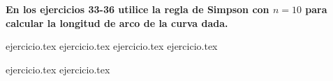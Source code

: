 \vspace{0.5cm}
\noindent\textbf{En los ejercicios 33-36 utilice la regla de Simpson con $n = 10$ para calcular la longitud de arco de la curva dada.}
\begin{enumerate}
    \setcounter{enumi}{32}
    {ejercicio.tex}
{ejercicio.tex}
{ejercicio.tex}
{ejercicio.tex}
\end{enumerate}

\vspace{0.5cm}
\begin{enumerate}
    \setcounter{enumi}{36}
    {ejercicio.tex}
{ejercicio.tex}
\end{enumerate}
